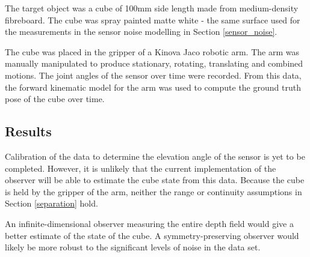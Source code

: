 		The target object was a cube of 100mm side length made from medium-density fibreboard. The cube was spray painted matte white - the same surface used for the measurements in the sensor noise modelling in Section \ref{sensor_noise}.
		
		The cube was placed in the gripper of a Kinova Jaco robotic arm. The arm was manually manipulated to produce stationary, rotating, translating and combined motions. The joint angles of the sensor over time were recorded. From this data, the forward kinematic model for the arm was used to compute the ground truth pose of the cube over time.		
		
	\subsection{Results}
		Calibration of the data to determine the elevation angle of the sensor is yet to be completed. However, it is unlikely that the current implementation of the observer will be able to estimate the cube state from this data. Because the cube is held by the gripper of the arm, neither the range or continuity assumptions in Section \ref{separation} hold.  
		
		An infinite-dimensional observer measuring the entire depth field would give a better estimate of the state of the cube. A symmetry-preserving observer would likely be more robust to the significant levels of noise in the data set.


